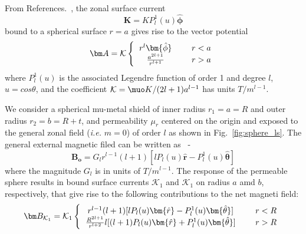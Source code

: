 From References.~\cite{CB1, smythe}, the zonal surface current
\begin{equation}\label{i}
\bm{K}=KP_l^1(u)\bm{\hat{\phi}}
\end{equation}
bound to a spherical surface $r=a$ gives rise to the vector potential
\begin{equation}\label{a}
\bm A =\mathcal{K} 
\left \{
  \begin{tabular}{ccc}
  $r^l \bm{\hat{\phi}}$ &  & $r< a$  \\
  $\frac{a^{2l+1}}{r^{l+1}}$ &  & $r> a$ 
  \end{tabular}
 \right.
\end{equation}
where $P_l^1(u)$ is the associated Legendre function of order 1 and degree $l$,  $u=cos\theta$, and the coefficient $\mathcal{K}={\muo K}/{(2l+1)a^{l-1}}$ has units $T/m^{l-1}$.


We consider a spherical mu-metal shield of inner radius $r_1=a=R$ and outer radius $r_2=b=R+t$, and permeability $\mu_r$ centered on the origin and exposed to the general zonal field (\textit{i.e.}
$m=0$)
of order $l$ %
as shown in Fig.~\ref{fig:sphere_ls}. The general external magnetic filed can be written as~\cite{CB1, smythe} -
\begin{equation}\label{bo}
\bm{B_o} = G_l r^{l-1} (l+1)[l P_l(u) \bm{\hat{r}} -  P_l^1(u)  \bm{\hat{\theta}} ] 
\end{equation}
where the magnitude $G_l$ is in units of $T/m^{l-1}$.  
The response of the permeable sphere  results in bound surface currents $\mathcal{K}_1$ and $\mathcal{K}_1$ on radius $a$ amd $b$, respectively, that give rise to the following contributions to the net magneti field:
\begin{equation}\label{r=R}
\bm B_{\mathcal{K}_1} =
\mathcal{K}_1
\left \{
  \begin{tabular}{ccc}
  $r^{l-1}(l+1)[l P_l(u)\bm{\hat{r}} -  P_l^1(u) \bm{\hat{\theta}} ]$ &  & $r< R$  \\
  $\frac{R^{2l+1}}{r^{l+2}}
l[(l+1) P_l(u) \bm{\hat{r}} +  P_l^1(u)  \bm{\hat{\theta}} ]$ &  & $r> R$  
  \end{tabular}
\right. 
\end{equation}

